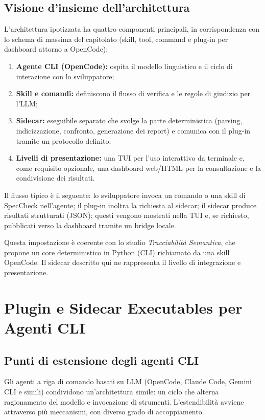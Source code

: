 \documentclass[a4paper, 11pt]{article}
\begin{document}
\subsection{Visione d'insieme dell'architettura}
L'architettura ipotizzata ha quattro componenti principali, in corrispondenza con lo schema di massima del capitolato (skill, tool, command e plug-in per dashboard attorno a OpenCode):
\begin{enumerate}[noitemsep]
    \item \textbf{Agente CLI (OpenCode):} ospita il modello linguistico e il ciclo di interazione con lo sviluppatore;
    \item \textbf{Skill e comandi:} definiscono il flusso di verifica e le regole di giudizio per l'LLM;
    \item \textbf{Sidecar:} eseguibile separato che svolge la parte deterministica (parsing, indicizzazione, confronto, generazione dei report) e comunica con il plug-in tramite un protocollo definito;
    \item \textbf{Livelli di presentazione:} una TUI per l'uso interattivo da terminale e, come requisito opzionale, una dashboard web/HTML per la consultazione e la condivisione dei risultati.
\end{enumerate}
Il flusso tipico è il seguente: lo sviluppatore invoca un comando o una skill di SpecCheck nell'agente; il plug-in inoltra la richiesta al sidecar; il sidecar produce risultati strutturati (JSON); questi vengono mostrati nella TUI e, se richiesto, pubblicati verso la dashboard tramite un bridge locale.

Questa impostazione è coerente con lo studio \textit{Tracciabilità Semantica}, che propone un core deterministico in Python (CLI) richiamato da una skill OpenCode. Il sidecar descritto qui ne rappresenta il livello di integrazione e presentazione.


\section{Plugin e Sidecar Executables per Agenti CLI}
\label{sec:sidecar}

\subsection{Punti di estensione degli agenti CLI}
Gli agenti a riga di comando basati su LLM (OpenCode, Claude Code, Gemini CLI e simili) condividono un'architettura simile: un ciclo che alterna ragionamento del modello e invocazione di strumenti. L'estendibilità avviene attraverso più meccanismi, con diverso grado di accoppiamento.
\end{document}
